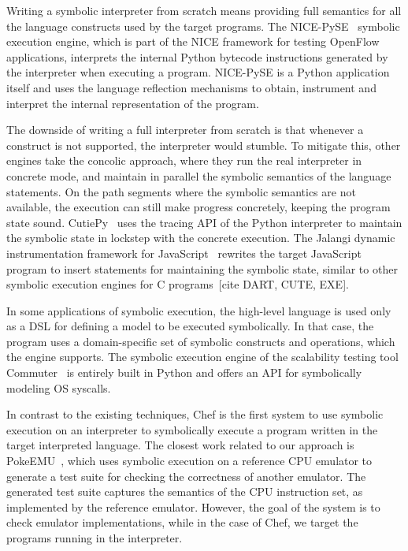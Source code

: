 Writing a symbolic interpreter from scratch means providing full semantics for all the language constructs used by the target programs.  The NICE-PySE~\cite{nice} symbolic execution engine, which is part of the NICE framework for testing OpenFlow applications, interprets the internal Python bytecode instructions generated by the interpreter when executing a program.  NICE-PySE is a Python application itself and uses the language reflection mechanisms to obtain, instrument and interpret the internal representation of the program.

The downside of writing a full interpreter from scratch is that whenever a construct is not supported, the interpreter would stumble.  To mitigate this, other engines take the concolic approach, where they run the real interpreter in concrete mode, and maintain in parallel the symbolic semantics of the language statements.  On the path segments where the symbolic semantics are not available, the execution can still make progress concretely, keeping the program state sound.  CutiePy~\cite{cutie-py} uses the tracing API of the Python interpreter to maintain the symbolic state in lockstep with the concrete execution.  The Jalangi dynamic instrumentation framework for JavaScript~\cite{jalangi} rewrites the target JavaScript program to insert statements for maintaining the symbolic state, similar to other symbolic execution engines for C programs~[cite DART, CUTE, EXE].

In some applications of symbolic execution, the high-level language is used only as a DSL for defining a model to be executed symbolically.  In that case, the program uses a domain-specific set of symbolic constructs and operations, which the engine supports.  The symbolic execution engine of the scalability testing tool Commuter~\cite{commuter} is entirely built in Python and offers an API for symbolically modeling OS syscalls.

In contrast to the existing techniques, Chef is the first system to use symbolic execution on an interpreter to symbolically execute a program written in the target interpreted language.  The closest work related to our approach is PokeEMU~\cite{hifi-lofi}, which uses symbolic execution on a reference CPU emulator to generate a test suite for checking the correctness of another emulator.  The generated test suite captures the semantics of the CPU instruction set, as implemented by the reference emulator.  However, the goal of the system is to check emulator implementations, while in the case of Chef, we target the programs running in the interpreter.

